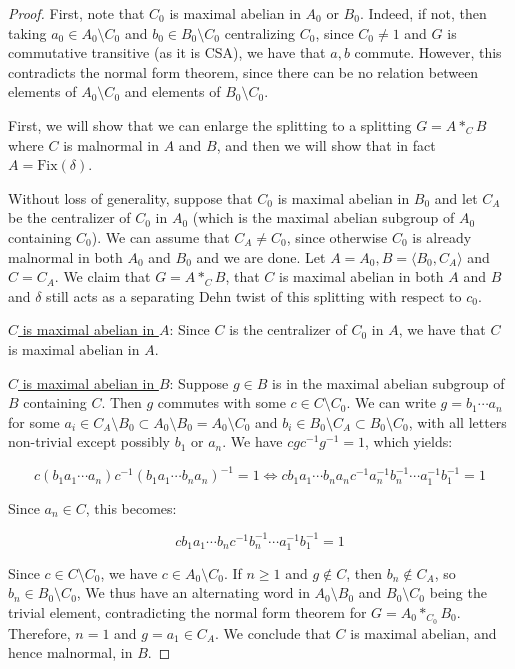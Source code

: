 \documentclass[10pt,a4paper]{amsart}
\newcommand{\vs}{\vspace{10pt}}
\begin{document}
\begin{proof}
    First, note that $C_0$ is maximal abelian in $A_0$ or $B_0$. Indeed, if not, then taking $a_0 \in A_0 \setminus C_0$ and $b_0 \in B_0 \setminus C_0$ centralizing $C_0$, since $C_0 \neq 1$ and $G$ is commutative transitive (as it is CSA), we have that $a,b$ commute. However, this contradicts the normal form theorem, since there can be no relation between elements of $A_0 \setminus C_0$ and elements of $B_0 \setminus C_0$. 

    First, we will show that we can enlarge the splitting to a splitting $G = A *_C B$ where $C$ is malnormal in $A$ and $B$, and then we will show that in fact $A = \mathrm{Fix}(\delta)$. 

    Without loss of generality, suppose that $C_0$ is maximal abelian in $B_0$ and let $C_A$ be the centralizer of $C_0$ in $A_0$ (which is the maximal abelian subgroup of $A_0$ containing $C_0$). We can assume that $C_A \neq C_0$, since otherwise $C_0$ is already malnormal in both $A_0$ and $B_0$ and we are done. Let $A = A_0, B = \langle B_0, C_A \rangle$ and $C = C_A$. We claim that $G = A *_C B$, that $C$ is maximal abelian in both $A$ and $B$ and $\delta$ still acts as a separating Dehn twist of this splitting with respect to $c_0$. 

\vs

\underline{$C$ is maximal abelian in $A$}: Since $C$ is the centralizer of $C_0$ in $A$, we have that $C$ is maximal abelian in $A$.

\vs

\underline{$C$ is maximal abelian in $B$}: Suppose $g \in B$ is in the maximal abelian subgroup of $B$ containing $C$. Then $g$ commutes with some $c \in C \setminus C_0$. We can write $g = b_1 \cdots a_n$ for some $a_i \in C_A \setminus B_0 \subset A_0 \setminus B_0 = A_0 \setminus C_0$ and $b_i \in B_0 \setminus C_A \subset B_0 \setminus C_0$, with all letters non-trivial except possibly $b_1$ or $a_n$. We have $cgc^{-1}g^{-1} = 1$, which yields: 

$$ c (b_1 a_1 \cdots a_n) c^{-1} (b_1 a_1 \cdots b_n a_n)^{-1} = 1 \iff c b_1 a_1 \cdots b_n a_n c^{-1}a_n^{-1} b_n^{-1} \cdots a_1^{-1} b_1^{-1} = 1$$

Since $a_n \in C$, this becomes: 


$$ c b_1 a_1 \cdots b_n c^{-1} b_n^{-1} \cdots a_1^{-1} b_1^{-1} = 1$$

Since $c \in C \setminus C_0$, we have $c \in A_0 \setminus C_0$. If $n \geq 1$ and $g \notin C$, then $b_n \notin C_A$, so $b_n \in B_0 \setminus C_0$, We thus have an alternating word in $A_0 \setminus B_0$ and $B_0 \setminus C_0$ being the trivial element, contradicting the normal form theorem for $G = A_0 *_{C_0} B_0$. Therefore, $n = 1$ and $g = a_1 \in C_A$. We conclude that $C$ is maximal abelian, and hence malnormal, in $B$.


\end{proof}
\end{document}
